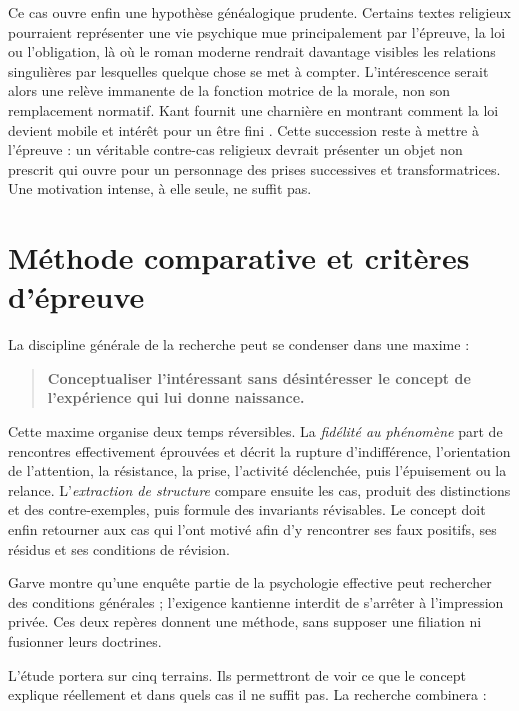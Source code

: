 \documentclass[11pt,a4paper]{article}
\begin{document}
Ce cas ouvre enfin une hypothèse généalogique prudente. Certains textes
religieux pourraient représenter une vie psychique mue principalement par
l'épreuve, la loi ou l'obligation, là où le roman moderne rendrait davantage
visibles les relations singulières par lesquelles quelque chose se met à
compter. L'intérescence serait alors une relève immanente de la fonction motrice
de la morale, non son remplacement normatif. Kant fournit une charnière en
montrant comment la loi devient mobile et intérêt pour un être fini
\parencite{kant1848moralepratique}. Cette succession reste à mettre à l'épreuve :
un véritable contre-cas religieux devrait présenter un objet non prescrit qui
ouvre pour un personnage des prises successives et transformatrices. Une
motivation intense, à elle seule, ne suffit pas.

\section{Méthode comparative et critères d'épreuve}

La discipline générale de la recherche peut se condenser dans une maxime :

\begin{quote}
\textbf{Conceptualiser l'intéressant sans désintéresser le concept de
l'expérience qui lui donne naissance.}
\end{quote}

Cette maxime organise deux temps réversibles. La \emph{fidélité au phénomène}
part de rencontres effectivement éprouvées et décrit la rupture d'indifférence,
l'orientation de l'attention, la résistance, la prise, l'activité déclenchée,
puis l'épuisement ou la relance. L'\emph{extraction de structure} compare ensuite
les cas, produit des distinctions et des contre-exemples, puis formule des
invariants révisables. Le concept doit enfin retourner aux cas qui l'ont motivé
afin d'y rencontrer ses faux positifs, ses résidus et ses conditions de révision.

Garve montre qu'une enquête partie de la psychologie effective peut rechercher
des conditions générales ; l'exigence kantienne interdit de s'arrêter à
l'impression privée. Ces deux repères donnent une méthode, sans supposer une
filiation ni fusionner leurs doctrines.

L'étude portera sur cinq terrains. Ils permettront de voir ce que le concept
explique réellement et dans quels cas il ne suffit pas. La recherche combinera :
\end{document}
